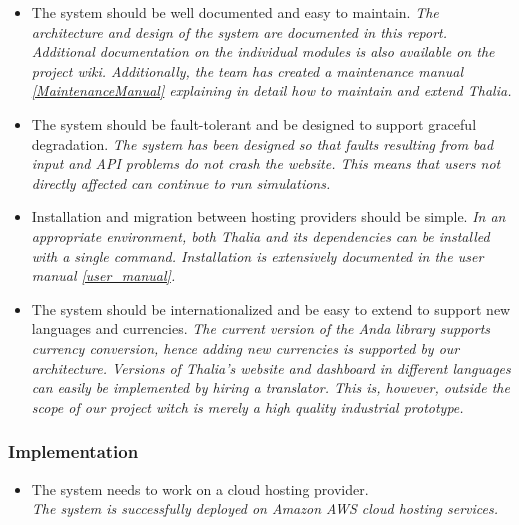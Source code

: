\documentclass[main.tex]{subfiles}
\begin{document}
\begin{itemize}
    \item The system should be well documented and easy to maintain.
    \textit{The architecture and design of the system are documented in this report. Additional documentation on the individual modules is also available on the project wiki. Additionally, the team has created a maintenance manual \ref{MaintenanceManual} explaining in detail how to maintain and extend Thalia.}
    
    \item The system should be fault-tolerant and be designed to support graceful degradation.
    \textit{The system has been designed so that faults resulting from bad input and API problems do not crash the website. This means that users not directly affected can continue to run simulations.}
    
    \item Installation and migration between hosting providers should be simple.
    \textit{In an appropriate environment, both Thalia and its dependencies can be installed with a single command. Installation is extensively documented in the user manual \ref{user_manual}.}
    
    \item The system should be internationalized and be easy to extend to support new languages and currencies.
    \textit{The current version of the Anda library supports currency conversion, hence adding new currencies is supported by our architecture. Versions of Thalia's website and dashboard in different languages can easily be implemented by hiring a translator. This is, however, outside the scope of our project witch is merely a high quality industrial prototype.}

\end{itemize}

\subsubsection{Implementation}
\begin{itemize}
    
    \item The system needs to work on a cloud hosting provider.\\
    \textit{The system is successfully deployed on Amazon AWS cloud hosting services.}

\end{itemize}
\end{document}
